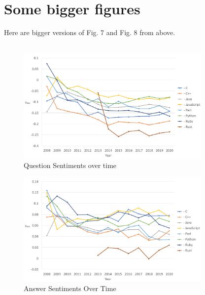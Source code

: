 \documentclass[conference]{IEEEtran}
\begin{document}
\section{Some bigger figures}
Here are bigger versions of Fig. 7 and Fig. 8 from above.\\\\
\begin{figure}[htbp]
\centering
\includegraphics[width=0.85\textwidth]{figures/time_questions_em.png}
\caption{Question Sentiments over time}
\label{fig}
\end{figure}

\begin{figure}[htbp]
\centering
\includegraphics[width=0.85\textwidth]{figures/time_answers_em.png}
\caption{Answer Sentiments Over Time}
\label{fig}
\end{figure}
\end{document}
